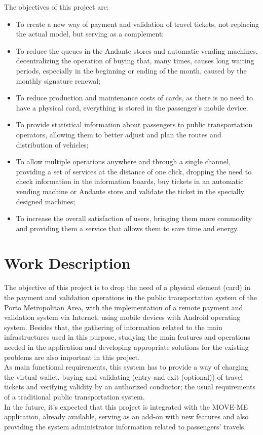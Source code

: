 \documentclass[9pt,a4paper]{extarticle}
\begin{document}
\begin{multicols}{2}
The objectives of this project are:
\begin{itemize}
\item To create a new way of payment and validation of travel tickets, not replacing the actual model, but serving as a complement;
\item To reduce the queues in the Andante stores and automatic vending machines, decentralizing the operation of buying that, many times, causes long waiting periods, especially in the beginning or ending of the month, caused by the monthly signature renewal;
\item To reduce production and maintenance costs of cards, as there is no need to have a physical card, everything is stored in the passenger’s mobile device;
\item To provide statistical information about passengers to public transportation operators, allowing them to better adjust and plan the routes and distribution of vehicles;
\item To allow multiple operations anywhere and through a single channel, providing a set of services at the distance of one click, dropping the need to check information in the information boards, buy tickets in an automatic vending machine or Andante store and validate the ticket in the specially designed machines;
\item To increase the overall satisfaction of users, bringing them more commodity and providing them a service that allows them to save time and energy.
\end{itemize}


\section{Work Description}\label{sec:work}

The objective of this project is to drop the need of a physical element (card) in the payment and validation operations in the public transportation system of the Porto Metropolitan Area, with the implementation of a remote payment and validation system via Internet, using mobile devices with Android operating system. Besides that, the gathering of information related to the main infrastructures used in this purpose, studying the main features and operations needed in the application and developing appropriate solutions for the existing problems are also important in this project.
\\As main functional requirements, this system has to provide a way of charging the virtual wallet, buying and validating (entry and exit (optional)) of travel tickets and verifying validity by an authorized conductor; the usual requirements of a traditional public transportation system. \cite{Buttyan2009}
\\In the future, it’s expected that this project is integrated with the MOVE-ME application, already available, serving as an add-on with new features and also providing the system administrator information related to passengers’ travels.


\end{multicols}
\end{document}
